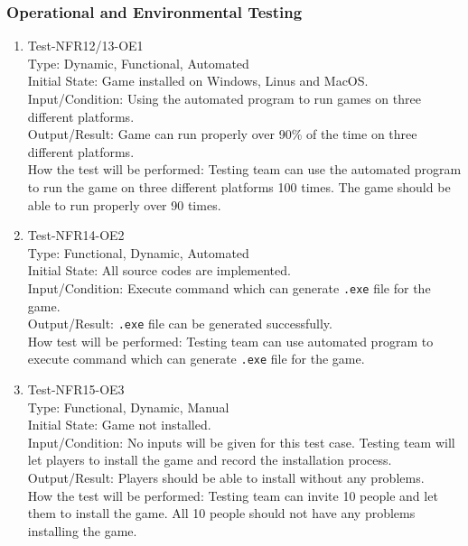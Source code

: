 \documentclass[12pt]{article}
\begin{document}
\subsubsection{Operational and Environmental Testing}
\begin{enumerate}[1.]
\item Test-NFR12/13-OE1\\
Type: Dynamic, Functional, Automated\\
Initial State: Game installed on Windows, Linus and MacOS.\\
Input/Condition: Using the automated program to run games
on three different platforms.\\
Output/Result: Game can run properly over 90\% of the time on three different platforms.\\
How the test will be performed: Testing team can use
 the automated program to run the game on three different 
 platforms 100 times. The game should be able to run 
 properly over 90 times.
\item Test-NFR14-OE2\\
Type: Functional, Dynamic, Automated\\
Initial State: All source codes are implemented.\\
Input/Condition: Execute 
command which can generate \verb|.exe| file for the game.\\
Output/Result: \verb|.exe| file can be generated successfully.\\
How test will be performed: Testing team can use
automated program to execute command which can generate
\verb|.exe| file for the game. 
\item Test-NFR15-OE3\\
Type: Functional, Dynamic, Manual\\
Initial State: Game not installed.\\
Input/Condition: No inputs will be given for this test 
case. Testing team will let players to install the game
and record the installation 
process.\\
Output/Result: Players should be able to install without
any problems.\\
How the test will be performed: Testing team can 
invite 10 people and let them to install the game. All
10 people should not have any problems installing the 
game.
\end{enumerate} \newpage
\end{document}
